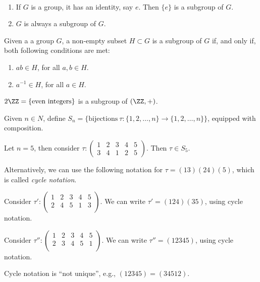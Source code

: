 \begin{exmp}~
	\begin{enumerate}
		\item If $G$ is a group, it has an identity, say $e$. Then $\{e\}$ is a subgroup of $G$. 
		\item $G$ is always a subgroup of $G$.
	\end{enumerate}
\end{exmp}

\begin{lem}
	Given a a group $G$, a non-empty subset $H \subset G$ is a subgroup of $G$ if, and only if, both following conditions are met:
	 \begin{enumerate}
		 \item $ab \in H$, for all  $a, b \in H$.
		 \item $a^{-1} \in H$, for all  $a \in H$.
	\end{enumerate}
\end{lem}

\begin{exmp}
	$2\ZZ = \{\text{even integers}\}$ is a subgroup of $(\ZZ, +)$.
\end{exmp}

\begin{defn}
	Given $n \in N$, define $S_n = \{\text{bijections}\ \tau: \{1, 2, \dots, n\} \to \{1, 2, \dots, n\}\}$, equipped with composition.
\end{defn}

\begin{exmp}
	Let $n = 5$, then consider $\tau:
	\begin{pmatrix}
		1 & 2 & 3 & 4 & 5\\
		3 & 4 & 1 & 2 & 5
	\end{pmatrix}.$ Then $\tau \in S_5$.

	Alternatively, we can use the following notation for $\tau = (13)(24)(5)$, which is called \emph{cycle notation}.
\end{exmp}

\begin{exmp}
	Consider $\tau':
	\begin{pmatrix}
		1 & 2 & 3 & 4 & 5\\
		2 & 4 & 5 & 1 & 3\\
	\end{pmatrix}$. We can write $\tau' = (1 2 4)(3 5)$, using cycle notation.
\end{exmp}

\begin{exmp}
	Consider $\tau'':
	\begin{pmatrix}
		1 & 2 & 3 & 4 & 5\\
		2 & 3 & 4 & 5 & 1\\
	\end{pmatrix}$. We can write $\tau'' = (1 2 3 4 5)$, using cycle notation.
\end{exmp}

\begin{rem}
	Cycle notation is ``not unique'', e.g., $(1 2 3 4 5) = (3 4 5 1 2)$.
\end{rem}
